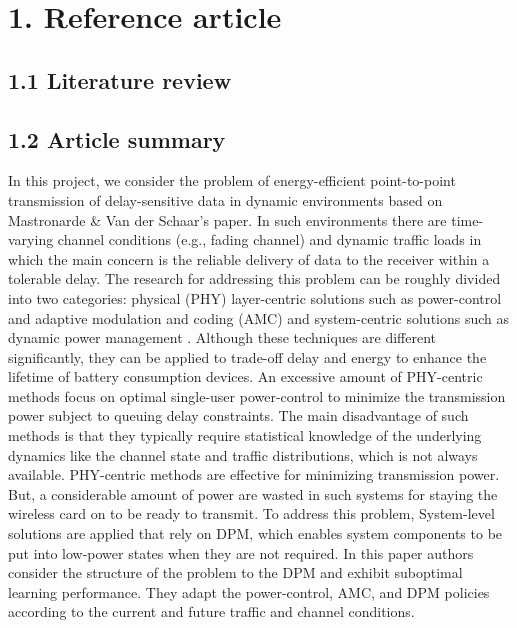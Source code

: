 \documentclass[a4paper, 12pt]{report}
\begin{document}
\chapter*{1. Reference article}

\section*{1.1 Literature review}

\section*{1.2 Article summary}

In this project, we consider the problem of energy-efficient point-to-point
transmission of delay-sensitive data in dynamic environments based on Mastronarde \& Van der Schaar's paper. In such environments there are time-varying channel conditions (e.g., fading channel) and dynamic traffic loads in which the main concern is the reliable delivery of data to the receiver within a tolerable delay. 
The research for addressing this problem can be roughly divided into two categories: 
physical (PHY) layer-centric solutions such as power-control and adaptive modulation and coding (AMC) 
and system-centric solutions such as dynamic power management \cite{Mastronarde-2011}.
Although these techniques are different significantly, they
can be applied to trade-off delay and energy to enhance the lifetime of battery consumption devices.
An excessive amount of PHY-centric methods focus on optimal single-user power-control to minimize
the transmission power subject to queuing delay constraints. 
The main disadvantage of such methods is that they typically require statistical knowledge of the underlying dynamics like the channel state and traffic distributions, which is not always available. 
PHY-centric methods are effective for minimizing transmission power. 
But, a considerable amount of power are wasted in such systems for staying the wireless
card on to be ready to transmit. 
To address this problem, System-level solutions are applied that  rely on DPM, which enables system components to be put into low-power states when they are not required. 
In this paper authors consider the structure of the problem to the DPM and exhibit suboptimal learning performance. They adapt the power-control, AMC, and DPM policies according to the current and future traffic and channel conditions. 
\end{document}
